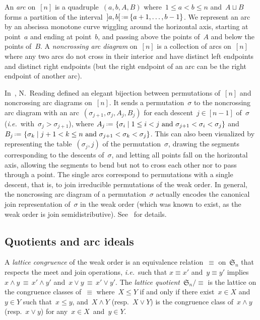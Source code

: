 \documentclass{amsart}
\theoremstyle{definition}
\newcommand{\f}[1]{\mathfrak{#1}} %
\newcommand{\set}[2]{\left\{ #1 \;\middle|\; #2 \right\}} %
\newcommand{\eqdef}{\mbox{\,\raisebox{0.2ex}{\scriptsize\ensuremath{\mathrm:}}\ensuremath{=}\,}} %
\newcommand{\ie}{\textit{i.e.}~} %
\newcommand{\darkblue}{\color{darkblue}} %
\newcommand{\defn}[1]{\textsl{\darkblue #1}} %
\newcommand{\meet}{\wedge} %
\newcommand{\join}{\vee} %
\begin{document}
An \defn{arc} on~$[n]$ is a quadruple~$(a, b, A, B)$ where~$1 \le a < b \le n$ and~$A \sqcup B$ forms a partition of the interval~${]a,b[} \eqdef \{a+1, \dots, b-1\}$.
We represent an arc by an abscissa monotone curve wiggling around the horizontal axis, starting at point~$a$ and ending at point~$b$, and passing above the points of~$A$ and below the points of~$B$.
A \defn{noncrossing arc diagram} on~$[n]$ is a collection of arcs on~$[n]$ where any two arcs do not cross in their interior and have distinct left endpoints and distinct right endpoints (but the right endpoint of an arc can be the right endpoint of another arc).

In~\cite{Reading-arcDiagrams}, N.~Reading defined an elegant bijection between permutations of~$[n]$ and noncrossing arc diagrams on~$[n]$.
It sends a permutation~$\sigma$ to the noncrossing arc diagram with an arc~$(\sigma_{j+1}, \sigma_j, A_j, B_j)$ for each descent~$j \in [n-1]$ of~$\sigma$ (\ie with~$\sigma_j > \sigma_{j+1}$), where \linebreak $A_j \eqdef \set{\sigma_i}{1 \le i < j \text{ and } \sigma_{j+1} < \sigma_i < \sigma_j}$ and~$B_j \eqdef \set{\sigma_k}{j+1 < k \le n \text{ and } \sigma_{j+1} < \sigma_k < \sigma_j}$. \linebreak
This can also been visualized by representing the table~$(\sigma_j,j)$ of the permutation~$\sigma$, drawing the segments corresponding to the descents of~$\sigma$, and letting all points fall on the horizontal axis, allowing the segments to bend but not to cross each other nor to pass through a point.
The single arcs correspond to permutations with a single descent, that is, to join irreducible permutations of the weak order.
In general, the noncrossing arc diagram of a permutation~$\sigma$ actually encodes the canonical join representation of~$\sigma$ in the weak order (which was known to exist, as the weak order is join semidistributive).
See~\cite{Reading-arcDiagrams} for details.

\subsection{Quotients and arc ideals}

A \defn{lattice congruence} of the weak order is an equivalence relation~$\equiv$ on~$\f{S}_n$ that respects the meet and join operations, \ie such that $x \equiv x'$ and~$y \equiv y'$ implies $x \meet y \, \equiv \, x' \meet y'$ and~$x \join y \, \equiv \, x' \join y'$.
The \defn{lattice quotient}~$\f{S}_n/{\equiv}$ is the lattice on the congruence classes of~$\equiv$ where~$X \le Y$ if and only if there exist~$x \in X$ and~$y \in Y$ such that~$x \le y$, and~$X \meet Y$ (resp.~$X \join Y$) is the congruence class of~$x \meet y$ (resp.~$x \join y$) for any~$x \in X$~and~$y \in Y$.
\end{document}
